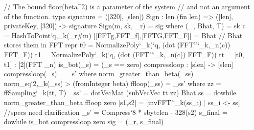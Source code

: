 
\begin{algorithm}[!htb]
	\caption{\sign(\msg, \sk, $\sqsignorm$)}\label{alg:sign}
	\begin{algorithmic}[1]
	\label{line:t}
	\Do\label{line:do}
	\Do
	\State{$\vecs = (\vect - \vecz)  \hat\matB$}
	\label{line:sqsig}
	\label{line:while}
	\end{algorithmic}
\end{algorithm}

\begin{code}
  // The bound floor(beta^2) is a parameter of the system
  // and not an argument of the function.
  type signature = ([320], [slen])
  Sign : {len} (fin len) => ([len], privateKey, [320]) -> signature
  Sign(m, sk, _r) = sig where 
    (_, Bhat, T) = sk
    c = HashToPoint`{q,_k}(_r#m)
    [[FFTg,FFT_f],[FFTG,FFT_F]] = Bhat // Bhat stores them in FFT repr
    t0 = NormalizePoly`{_k}(`q, (dot (FFT''`{_k,_n}(c)) FFT_F))
    t1 = NormalizePoly`{_k}(`q, (dot (FFT''`{_k,_n}(c)) FFT_F))
    tt = [t0, t1] : [2](FFT _n)
    is_bot(_s) = (_s == zero)
    compressloop : [slen] -> [slen]
    compressloop(_s) = _s' where
      norm_greater_than_beta(_ss) = norm_sq`{2,_k}(_ss) > (fromInteger beta)
      ffloop(_ss) = _ss' where 
        zz = ffSampling`{_k}(tt, T)
        _ss' = dotVecMat (subVecVec tt zz) Bhat
      ss = dowhile norm_greater_than_beta ffloop zero
      [s1,s2] = [invFFT'`{_k}(ss_i) | ss_i <- ss] //specs need clarification
      _s' = Compress`{8 * sbytelen - 328}(s2)
    s_final = dowhile is_bot compressloop zero
    sig = (_r, s_final)
\end{code}

